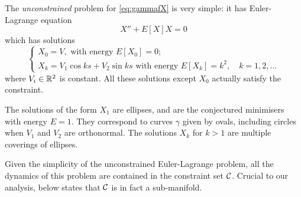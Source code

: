 


The \emph{unconstrained} problem for \eqref{eq:gammafX} is very simple:  it has Euler-Lagrange equation
$$X''+ E[X] X=0$$
which has solutions 
\begin{equation}  \label{ellipses}
\begin{cases}
X_0=V, %
\text{ with energy }E[X_0]=0; \\ 
X_k=V_1\cos ks+ V_2\sin ks \text{ with energy }E[X_k]=k^2, \quad k=1,2,\dots
\end{cases}
\end{equation}
where $V_i\in{\mathbb R}^2$ is constant.     All these solutions except $X_0$ actually satisfy the constraint.  

The solutions of the form $X_1$ are ellipses, and are the conjectured minimisers with energy $E=1$.  They correspond to curves $\gamma$ given by ovals, including circles when $V_1$ and $V_2$ are orthonormal.    The solutions $X_k$ for $k>1$ are multiple coverings of ellipses.

Given the simplicity of the unconstrained Euler-Lagrange problem, all the dynamics of this problem are contained in the constraint set \(\operatorname{\mathcal{C}}\). Crucial to our analysis,  below states that \(\operatorname{\mathcal{C}}\) is in fact a sub-manifold.
